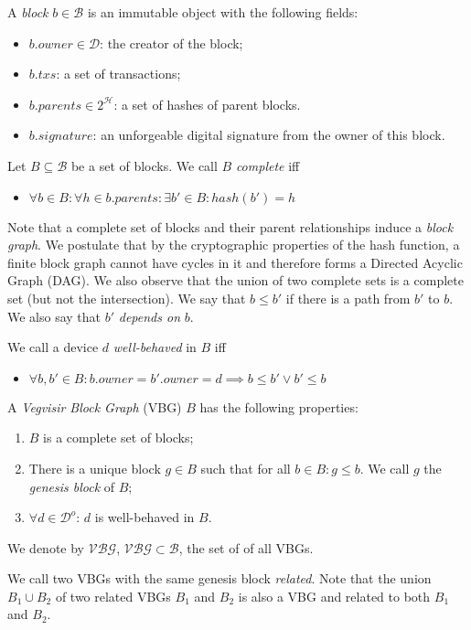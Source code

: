 \documentclass{article}
\begin{document}
A \emph{block} $b \in \mathcal{B}$ is an immutable object with the following fields:
\begin{itemize}
\item $b.\mathit{owner} \in \mathcal{D}$: the creator of the block;
\item $b.\mathit{txs}$: a set of transactions;
\item $b.\mathit{parents} \in 2^\mathcal{H}$: a set of hashes of parent blocks.
\item $b.\mathit{signature}$: an unforgeable digital signature from the owner of this block.
\end{itemize}


Let $B \subseteq \mathcal{B}$ be a set of blocks.  We call $B$ \emph{complete} iff
\begin{itemize}
\item $\forall b \in B: \forall h \in b.\mathit{parents}: \exists b' \in B: \mathit{hash}(b') = h$
\end{itemize}

Note that a complete set of blocks and their parent relationships induce a \emph{block graph}.
We postulate that by the cryptographic properties of the hash function,
a finite block graph cannot have cycles in it and therefore forms a Directed Acyclic Graph (DAG).
We also observe that the union of two complete sets is a complete set (but not the intersection).
We say that $b \leq b'$ if there is a path from $b'$ to $b$.
We also say that $b'$ \emph{depends on} $b$.

We call a device $d$ \emph{well-behaved} in $B$ iff
\begin{itemize}
\item $\forall b, b' \in B: b.\mathit{owner} = b'.\mathit{owner} = d \implies b \leq b' \vee b' \leq b$
\end{itemize}

A \emph{Vegvisir Block Graph} (VBG) $B$ has the following properties:
\begin{enumerate}
\item $B$ is a complete set of blocks;
\item There is a unique block $g \in B$ such that for all $b \in B: g \leq b$.  We call $g$ the \emph{genesis block} of $B$;
\item $\forall d \in \mathcal{D}^o$: $d$ is well-behaved in $B$.
\end{enumerate}
We denote by $\mathcal{VBG}$, $\mathcal{VBG} \subset \mathcal{B}$, the set of of all VBGs.

We call two VBGs with the same genesis block \emph{related}.
Note that the union $B_1 \cup B_2$ of two related VBGs $B_1$ and $B_2$ is also a VBG and
related to both $B_1$ and $B_2$.
\end{document}
